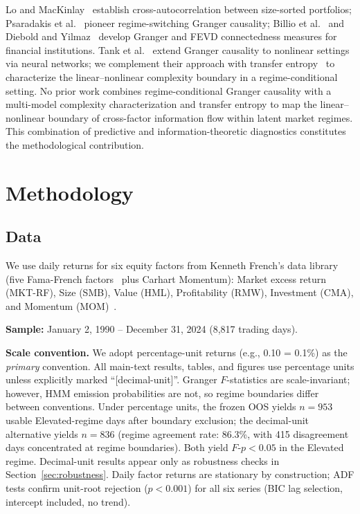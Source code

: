 \documentclass[sigconf,anonymous]{acmart}
\begin{document}
Lo and MacKinlay~\cite{lo1990contrarian} establish cross-autocorrelation between
size-sorted portfolios; Psaradakis et al.~\cite{psaradakis2005markov} pioneer
regime-switching Granger causality; Billio et al.~\cite{billio2012econometric}
and Diebold and Yilmaz~\cite{diebold2012better} develop Granger and FEVD
connectedness measures for financial institutions.
Tank et al.~\cite{tank2022neural} extend Granger causality to nonlinear settings
via neural networks; we complement their approach with transfer
entropy~\cite{schreiber2000measuring,barnett2009granger} to characterize
the linear--nonlinear complexity boundary in a regime-conditional setting.
No prior work combines regime-conditional Granger causality with
a multi-model complexity characterization and transfer entropy
to map the linear--nonlinear boundary of cross-factor information flow
within latent market regimes. This combination of predictive and
information-theoretic diagnostics constitutes the methodological
contribution.

\section{Methodology}

\subsection{Data}

We use daily returns for six equity factors from Kenneth French's data library~\cite{french2024data} (five Fama-French factors~\cite{fama2015five} plus Carhart Momentum):
Market excess return (MKT-RF), Size (SMB), Value (HML), Profitability (RMW),
Investment (CMA), and Momentum (MOM)~\cite{jegadeesh1993returns,carhart1997persistence}.

\textbf{Sample:} January 2, 1990 -- December 31, 2024 (8,817 trading days).

\textbf{Scale convention.} We adopt percentage-unit returns (e.g., 0.10 = 0.1\%) as the
\emph{primary} convention. All main-text results, tables, and figures use
percentage units unless explicitly marked ``[decimal-unit]''.
Granger $F$-statistics are scale-invariant; however, HMM emission probabilities are not,
so regime boundaries differ between conventions. Under percentage units,
the frozen OOS yields $n = 953$ usable Elevated-regime days after boundary exclusion; the decimal-unit alternative yields $n = 836$
(regime agreement rate: 86.3\%, with 415 disagreement days concentrated at regime boundaries).
Both yield $F$-$p < 0.05$ in the Elevated regime.
Decimal-unit results appear only as robustness checks in Section~\ref{sec:robustness}.
Daily factor returns are stationary by construction; ADF tests confirm unit-root
rejection ($p < 0.001$) for all six series (BIC lag selection, intercept included,
no trend).
\end{document}

